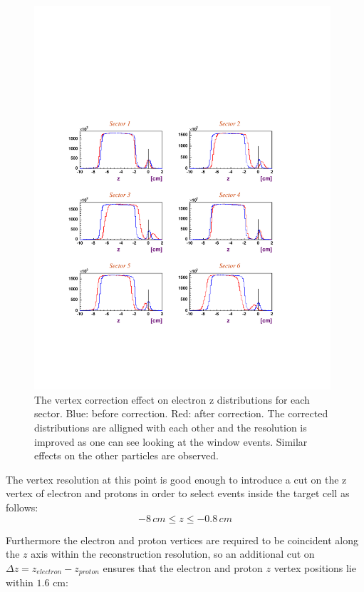 \begin{figure}[h]
 \begin{center}
  \includegraphics[width=11cm, bb=60 120 520 620]{data_reduction/img/vertex_corr}
  \caption[The vertex correction effect on electron z distributions for each sector]
          { The vertex correction effect on electron z distributions for each sector. 
	             Blue: before correction. Red: 
                     after correction. The corrected distributions are alligned with each other
                     and the resolution is improved as one can see looking at the 
                     window events. 
                     Similar effects on the other particles are observed.}
 \label{fig:vertex_corr}
   \end{center}
\end{figure}
The vertex resolution at this point is good enough to introduce a cut on the z vertex of electron and protons
in order to select events inside the target cell as follows:
\begin{equation}
 -8\, cm \le z \le -0.8\, cm
\label{eqn:vertex_cut1} 
\end{equation}

Furthermore the electron and proton vertices are required to be coincident along the $z$ axis
within the reconstruction resolution, so
an additional cut on $\Delta z = z_{electron} - z_{proton}$ ensures that the electron and proton 
$z$ vertex positions lie within $1.6$ cm:


